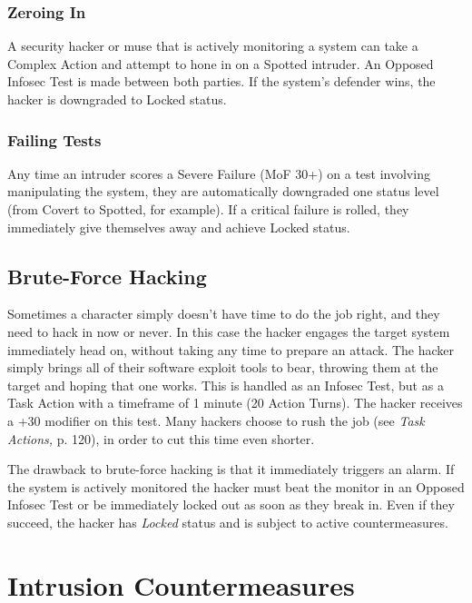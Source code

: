 \subsubsection{Zeroing In}

A security hacker or muse that is actively monitoring 
a system can take a Complex Action and attempt to 
hone in on a Spotted intruder. An Opposed Infosec Test 
is made between both parties. If the system's defender 
wins, the hacker is downgraded to Locked status.

\subsubsection{Failing Tests}

Any time an intruder scores a Severe Failure (MoF 
30+) on a test involving manipulating the system, they 
are automatically downgraded one status level (from 
Covert to Spotted, for example). If a critical failure 
is rolled, they immediately give themselves away and 
achieve Locked status.

\subsection{Brute-Force Hacking}

Sometimes a character simply doesn't have time to do 
the job right, and they need to hack in now or never. 
In this case the hacker engages the target system immediately
head on, without taking any time to prepare
an attack. The hacker simply brings all of their
software exploit tools to bear, throwing them at the 
target and hoping that one works. This is handled as 
an Infosec Test, but as a Task Action with a timeframe 
of 1 minute (20 Action Turns). The hacker receives 
a +30 modifier on this test. Many hackers choose to 
rush the job (see \textit{Task Actions,} p. 120), in order to cut 
this time even shorter.

The drawback to brute-force hacking is that it immediately
triggers an alarm. If the system is actively monitored
the hacker must beat the monitor in an Opposed
Infosec Test or be immediately locked out as soon as 
they break in. Even if they succeed, the hacker has 
\textit{Locked} status and is subject to active countermeasures.

\section{Intrusion Countermeasures}

